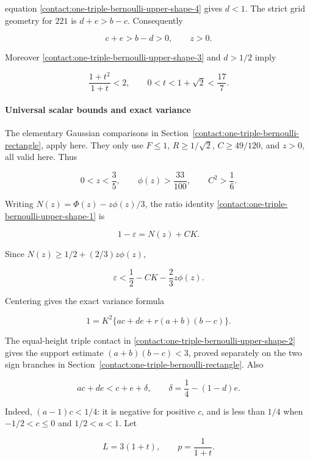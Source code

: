 equation \eqref{contact:one-triple-bernoulli-upper-shape-4} gives $d<1$. The strict grid geometry for $221$ is
$d+e>b-c$. Consequently

\[
 c+e>b-d>0,\qquad z>0.
\tag{B.10.5}\label{contact:one-triple-bernoulli-upper-shape-5}
\]

Moreover \eqref{contact:one-triple-bernoulli-upper-shape-3} and $d>1/2$ imply

\[
 \frac{1+t^2}{1+t}<2,
 \qquad 0<t<1+\sqrt2<\frac{17}{7}.
\tag{B.10.6}\label{contact:one-triple-bernoulli-upper-shape-6}
\]

\paragraph{Universal scalar bounds and exact variance}

The elementary Gaussian comparisons in
Section~\ref{contact:one-triple-bernoulli-rectangle},
apply here. They only use $F\le 1$, $R\ge 1/\sqrt{2}$,
$C\ge49/120$, and $z>0$, all valid here. Thus

\[
 0<z<\frac35,
 \qquad \phi(z)>\frac{33}{100},
 \qquad C^2>\frac16.
\tag{B.10.7}\label{contact:one-triple-bernoulli-upper-shape-7}
\]

Writing $N(z)=\Phi(z)-z \phi(z)/3$, the ratio identity \eqref{contact:one-triple-bernoulli-upper-shape-1} is

\[
 1-\varepsilon=N(z)+CK.
\]

Since $N(z)\ge 1/2+(2/3)z \phi(z)$,

\[
 \varepsilon<\frac12-CK-\frac23z\phi(z).
\tag{B.10.8}\label{contact:one-triple-bernoulli-upper-shape-8}
\]

Centering gives the exact variance formula

\[
 1=K^2\{ac+de+r(a+b)(b-c)\}.
\tag{B.10.9}\label{contact:one-triple-bernoulli-upper-shape-9}
\]

The equal-height triple contact in \eqref{contact:one-triple-bernoulli-upper-shape-2} gives the support estimate
$(a+b)(b-c)<3$, proved separately on the two sign branches in
Section~\ref{contact:one-triple-bernoulli-rectangle}. Also

\[
 ac+de<c+e+\delta,
 \qquad \delta=\frac14-(1-d)e.
\tag{B.10.10}\label{contact:one-triple-bernoulli-upper-shape-10}
\]

Indeed, $(a-1)c<1/4$: it is negative for positive $c$, and is less
than $1/4$ when $-1/2<c\le 0$ and $1/2<a<1$. Let

\[
 L=3(1+t),\qquad p=\frac1{1+t}.
\]

